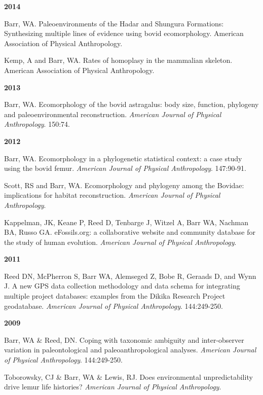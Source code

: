 \documentclass{article}
\begin{document}
\begin{description*}
\item[] {\bfseries 2014}
\item[] Barr, WA. Paleoenvironments of the Hadar and Shungura Formations: Synthesizing multiple lines of evidence using bovid ecomorphology. American Association of Physical Anthropology.
\item[] Kemp, A and Barr, WA. Rates of homoplasy in the mammalian skeleton. American Association of Physical Anthropology.
\end{description*}

\begin{description*}
\item[] {\bfseries 2013}
\item[] Barr, WA. Ecomorphology of the bovid astragalus: body size, function, phylogeny and paleoenvironmental reconstruction. \emph{American Journal of Physical Anthropology}. 150:74.
\end{description*}
\begin{description*}
\item[] {\bfseries 2012}
\item[] Barr, WA. Ecomorphology in a phylogenetic statistical context: a case study using the bovid femur. \emph{American Journal of Physical Anthropology}. 147:90-91.

\item[] Scott, RS and Barr, WA. Ecomorphology and phylogeny among the Bovidae: implications for habitat reconstruction. \emph{American Journal of Physical Anthropology}.

\item[] Kappelman, JK, Keane P, Reed D, Tenbarge J, Witzel A, Barr WA, Nachman BA, Russo GA. eFossils.org: a collaborative website and community database for the study of human evolution. \emph{American Journal of Physical Anthropology}.
\end{description*}
\begin{description*}
\item[] {\bfseries 2011}
\item[] Reed DN, McPherron S, Barr WA, Alemseged Z, Bobe R, Geraads D, and Wynn J. A new GPS data collection methodology and data schema for integrating multiple project databases: examples from the Dikika Research Project geodatabase. \emph{American Journal of Physical Anthropology}. 144:249-250.
\end{description*}
\begin{description*}
\item[] {\bfseries 2009}
\item[] Barr, WA \& Reed, DN. Coping with taxonomic ambiguity and inter-observer variation in paleontological and paleoanthropological analyses. \emph{American Journal of Physical Anthropology}. 144:249-250.

\item[] Toborowsky, CJ \& Barr, WA \& Lewis, RJ. Does environmental unpredictability drive lemur life histories? \emph{American Journal of Physical Anthropology}.
\end{description*}
\end{document}
